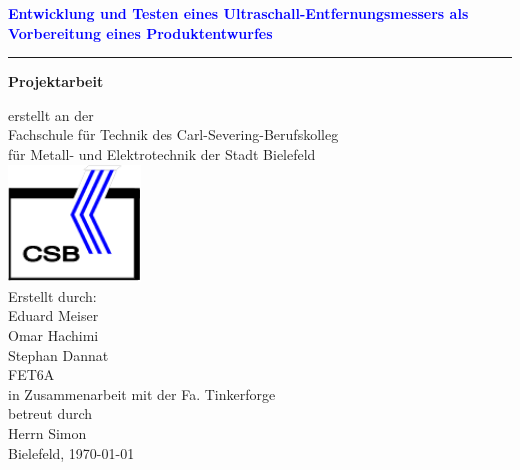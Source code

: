 \begin{center}
\begin{Huge}
\textcolor{blue}{\textbf{Entwicklung und Testen eines Ultraschall-Entfernungsmessers als Vorbereitung eines Produktentwurfes}}
\end{Huge}
\rule{\textwidth}{.4pt}
\vspace{1.5cm}

\huge{\textbf{Projektarbeit}}\\
\begin{Large}
erstellt an der\\
Fachschule für Technik des Carl-Severing-Berufskolleg\\
für Metall- und Elektrotechnik der Stadt Bielefeld\\
\includegraphics[width=100pt]{Abbildungen/CSBlogo.png}\\

Erstellt durch:\\
\vspace{12pt}
Eduard Meiser\\Omar Hachimi \\Stephan Dannat\\FET6A\\
\vspace{12pt}
in Zusammenarbeit mit der Fa. Tinkerforge\\
betreut durch\\
Herrn Simon\\
Bielefeld, \today
\end{Large}
\end{center}
